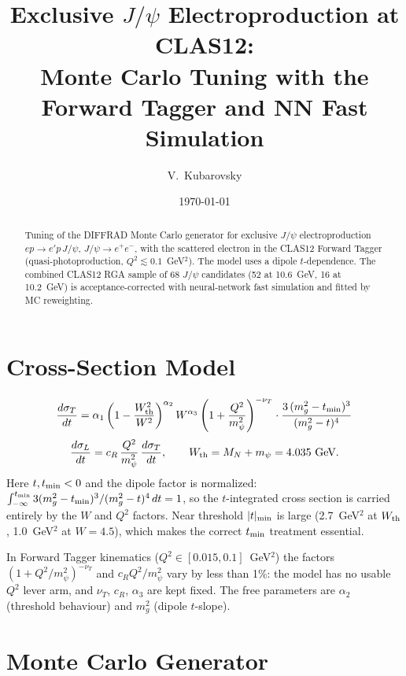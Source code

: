 \documentclass[12pt,a4paper]{article}
\title{Exclusive $J/\psi$ Electroproduction at CLAS12:\\
Monte Carlo Tuning with the Forward Tagger and NN Fast Simulation}
\author{V.~Kubarovsky}
\date{\today}
\begin{document}
\maketitle

\begin{abstract}
Tuning of the DIFFRAD Monte Carlo generator for exclusive $J/\psi$
electroproduction $ep \to e' p\, J/\psi$, $J/\psi \to e^+e^-$, with the
scattered electron in the CLAS12 Forward Tagger (quasi-photoproduction,
$Q^2 \lesssim 0.1$~GeV$^2$). The model uses a dipole $t$-dependence.
The combined CLAS12 RGA sample of 68 $J/\psi$ candidates
(52 at 10.6~GeV, 16 at 10.2~GeV) is acceptance-corrected with neural-network
fast simulation and fitted by MC reweighting.
\end{abstract}

\tableofcontents
\newpage

\section{Cross-Section Model}

\begin{equation}
\frac{d\sigma_T}{dt} = \alpha_1 \left(1-\frac{W_{\rm th}^2}{W^2}\right)^{\alpha_2}
W^{\alpha_3} \left(1+\frac{Q^2}{m_\psi^2}\right)^{-\nu_T}
\cdot \frac{3\,(m_g^2 - t_{\rm min})^3}{(m_g^2-t)^4}
\end{equation}
\begin{equation}
\frac{d\sigma_L}{dt} = c_R\,\frac{Q^2}{m_\psi^2}\,\frac{d\sigma_T}{dt},
\qquad W_{\rm th} = M_N + m_\psi = 4.035~\text{GeV}.
\end{equation}
Here $t, t_{\rm min} < 0$ and the dipole factor is normalized:
$\int_{-\infty}^{t_{\rm min}} 3(m_g^2-t_{\rm min})^3/(m_g^2-t)^4\,dt = 1$,
so the $t$-integrated cross section is carried entirely by the $W$ and $Q^2$
factors. Near threshold $|t|_{\rm min}$ is large (2.7~GeV$^2$ at $W_{\rm th}$,
1.0~GeV$^2$ at $W=4.5$), which makes the correct $t_{\rm min}$ treatment
essential.

In Forward Tagger kinematics ($Q^2 \in [0.015, 0.1]$~GeV$^2$) the factors
$(1+Q^2/m_\psi^2)^{-\nu_T}$ and $c_R Q^2/m_\psi^2$ vary by less than 1\%:
the model has no usable $Q^2$ lever arm, and $\nu_T$, $c_R$, $\alpha_3$ are
kept fixed. The free parameters are $\alpha_2$ (threshold behaviour) and
$m_g^2$ (dipole $t$-slope).

\section{Monte Carlo Generator}
\end{document}
